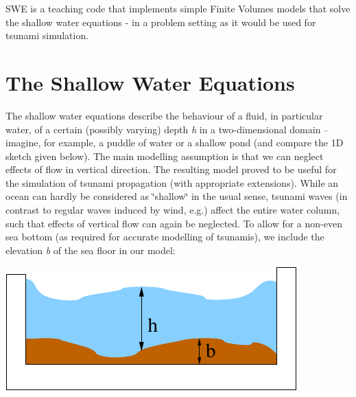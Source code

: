 S\-W\-E is a teaching code that implements simple Finite Volumes models that solve the shallow water equations -\/ in a problem setting as it would be used for tsunami simulation.\hypertarget{index_intro}{}\section{The Shallow Water Equations}\label{index_intro}
The shallow water equations describe the behaviour of a fluid, in particular water, of a certain (possibly varying) depth {\itshape h} in a two-\/dimensional domain -- imagine, for example, a puddle of water or a shallow pond (and compare the 1\-D sketch given below). The main modelling assumption is that we can neglect effects of flow in vertical direction. The resulting model proved to be useful for the simulation of tsunami propagation (with appropriate extensions). While an ocean can hardly be considered as \char`\"{}shallow\char`\"{} in the usual sense, tsunami waves (in contrast to regular waves induced by wind, e.\-g.) affect the entire water column, such that effects of vertical flow can again be neglected. To allow for a non-\/even sea bottom (as required for accurate modelling of tsunamis), we include the elevation {\itshape b} of the sea floor in our model\-:


\begin{DoxyImageNoCaption}
  \mbox{\includegraphics{basin_bathy}}
\end{DoxyImageNoCaption}
 

